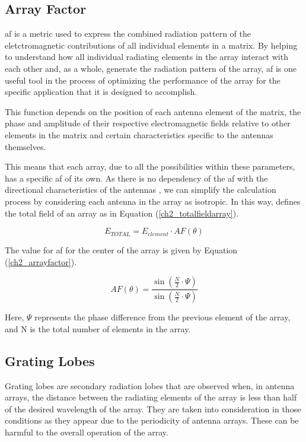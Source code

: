 \subsection{Array Factor}
\par \ac{af} is a metric used to express the combined radiation pattern of the eletctromagnetic contributions of all individual elements in a matrix. By helping to understand how all individual radiating elements in the array interact with each other and, as a whole, generate the radiation pattern of the array, \ac{af} is one useful tool in the process of optimizing the performance of the array for the specific application that it is designed to accomplish.

\par This function depends on the position of each antenna element of the matrix, the phase and amplitude of their respective electromagnetic fields relative to other elements in the matrix and certain characteristics specific to the antennas themselves.

\par This means that each array, due to all the possibilities within these parameters, has a specific \ac{af} of its own. As there is no dependency of the \ac{af} with the directional characteristics of the antennas \cite{ConstantineA.Balanis2016AntennaDesign}, we can simplify the calculation process by considering each antenna in the array as isotropic. In this way, \citeauthor{ConstantineA.Balanis2016AntennaDesign} defines the total field of an array as in Equation (\ref{ch2_totalfieldarray}).

\begin{equation}
    \label{ch2_totalfieldarray}
    E_{TOTAL} = E_{element}\cdot AF(\theta)
\end{equation}

\par The value for \ac{af} for the center of the array is given by Equation (\ref{ch2_arrayfactor})\cite{Delos2020PhasedFactor}.

\begin{equation}
    \label{ch2_arrayfactor}
    AF(\theta) = \frac{\sin(\frac{N}{2}\cdot\Psi)}{\sin(\frac{N}{2}\cdot\Psi)}
\end{equation}

\par Here, $\Psi$ represents the phase difference from the previous element of the array, and N is the total number of elements in the array.

\subsection{Grating Lobes}
\par Grating lobes are secondary radiation lobes that are observed when, in antenna arrays, the distance between the radiating elements of the array is less than half of the desired wavelength of the array. They are taken into consideration in those conditions as they appear due to the periodicity of antenna arrays. These can be harmful to the overall operation of the array.

